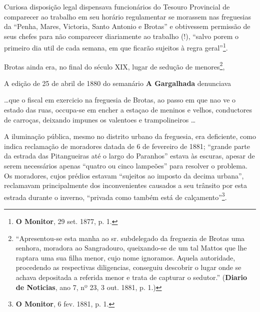 Curiosa disposição legal dispensava funcionários do Tesouro Provincial de comparecer ao trabalho em seu horário regulamentar se morassem nas freguesias da ``Penha, Mares, Victoria, Santo Antonio e Brotas'' e obtivessem permissão de seus chefes para não comparecer diariamente ao trabalho (!), ``salvo porem o primeiro dia util de cada semana, em que ficarão sujeitos à regra geral''\footnote{\textbf{O Monitor}, 29 set. 1877, p. 1.}.

Brotas ainda era, no final do século XIX, lugar de sedução de menores\footnote{  ``Apresentou-se esta manha ao sr. subdelegado da freguezia de Brotas uma senhora, moradora ao Sangradouro, queixando-se de um tal Mattos que lhe raptara uma sua filha menor, cujo nome ignoramos. Aquela autoridade, procedendo as respectivas diligencias, conseguiu descobrir o lugar onde se achava depositada a referida menor e trata de capturar o sedutor.'' (\textbf{Diario de Noticias}, ano 7, nº 23, 3 out. 1881, p. 1.)}, 

A edição de 25 de abril de 1880 do semanário \textbf{A Gargalhada} denunciava

\begin{citacao}
\dots que o fiscal em exercicio na freguesia de Brotas, ao passo em que nao ve o estado das ruas, occupa-se em encher a estaçao de meninos e velhos, conductores de carroças, deixando impunes os valentoes e trampolineiros \dots
\end{citacao}

A iluminação pública, mesmo no distrito urbano da freguesia, era deficiente, como indica reclamação de moradores datada de 6 de fevereiro de 1881; ``grande parte da estrada das Pitangueiras até o largo do Paranhos'' estava às escuras, apesar de serem necessários apenas ``quatro ou cinco lampeões'' para resolver o problema. Os moradores, cujos prédios estavam ``sujeitos ao imposto da decima urbana'', reclamavam principalmente dos inconvenientes causados a seu trânsito por esta estrada durante o inverno, ``privada como também está de calçamento''\footnote{\textbf{O Monitor}, 6 fev. 1881, p. 1.}.

